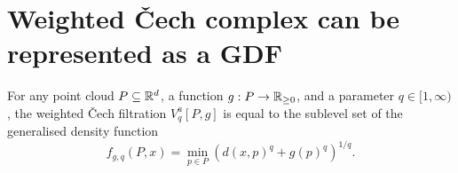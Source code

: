 \chapter{Weighted \v{C}ech complex can be represented as a GDF}
\label{app:weighted_cech}

\begin{lemma}
    For any point cloud $P \subseteq \mathbb{R}^d$, a function $g : P \to \mathbb{R}_{\geq 0}$, and a
    parameter $q \in [1, \infty)$, the weighted \v{C}ech filtration
    $V^a_q[P, g]$ is equal to the sublevel set of the generalised density
    function
    \begin{equation}
        f_{g, q}(P, x) = \min_{p \in P} (d(x, p)^q + g(p)^q)^{1/q}.
    \end{equation}
\end{lemma}

